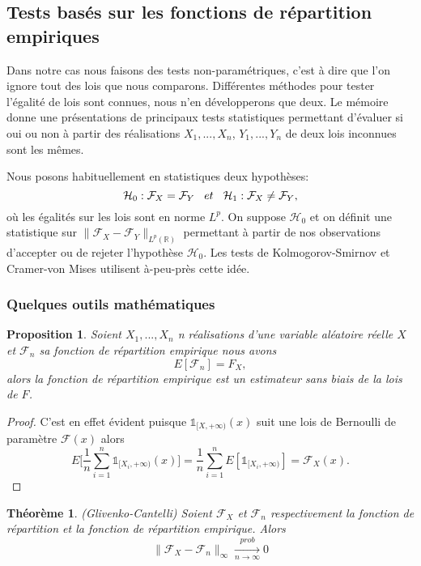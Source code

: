 \documentclass[a4paper,10pt]{article}
\newtheorem{theorem}{Théorème}[section]
\newtheorem{proposition}{Proposition}
\begin{document}
\subsection{Tests basés sur les fonctions de répartition empiriques}
Dans notre cas nous faisons des tests non-paramétriques, c'est à dire que l'on ignore tout des lois que nous comparons.
Différentes méthodes pour tester l'égalité de lois sont connues, nous n'en développerons que deux. Le mémoire \cite{ethier2011propos} donne une présentations de principaux tests statistiques permettant d'évaluer si oui ou non à partir des réalisations $X_1,...,X_n$, $Y_1,...,Y_n$ de deux lois inconnues sont les mêmes. 

Nous posons habituellement en statistiques deux hypothèses:
\[ \mathcal{H}_0: \mathcal{F}_{X} = \mathcal{F}_{Y} \hspace{3mm} et \hspace{3mm} \mathcal{H}_1: \mathcal{F}_{X} \neq \mathcal{F}_{Y},\]
où les égalités sur les lois sont en norme $L^p$. On suppose $\mathcal{H}_0$ et on définit une statistique sur $\|\mathcal{F}_{X}-\mathcal{F}_{Y}\|_{L^p(\mathbb{R})}$ permettant à partir de nos observations d'accepter ou de rejeter l'hypothèse $\mathcal{H}_0$.
Les tests de Kolmogorov-Smirnov et Cramer-von Mises utilisent à-peu-près cette idée. 

\subsubsection{Quelques outils mathématiques}

\begin{proposition}
	\label{mean-rep-emp}
	Soient $X_1,...,X_n$ n réalisations d'une variable aléatoire réelle $X$ et $\mathcal{F}_{n}$ sa fonction de répartition empirique nous avons
	\[E[\mathcal{F}_n]=F_{X},\]
	alors la fonction de répartition empirique est un estimateur sans biais de la lois de $F$. 
\end{proposition}

\begin{proof}
	C'est en effet évident puisque $\mathds{1}_{[X, +\infty )}(x)$ suit une lois de Bernoulli de paramètre $\mathcal{F}(x)$ alors 
	\[E\Big[\frac{1}{n}\sum_{i=1}^{n}\mathds{1}_{[X_i, +\infty )}(x)\Big]= \frac{1}{n}\sum_{i=1}^{n}E[\mathds{1}_{[X_i, +\infty )}]=\mathcal{F}_{X}(x).\]
\end{proof}


\begin{theorem}(Glivenko-Cantelli)
Soient $\mathcal{F}_{X}$ et $\mathcal{F}_{n}$ respectivement la fonction de répartition et la fonction de répartition empirique. Alors 
\begin{equation}
	\|\mathcal{F}_{X}-\mathcal{F}_{n}\|_{\infty} \xrightarrow[n\to \infty]{prob} 0 
\end{equation}
\end{theorem}
\end{document}
